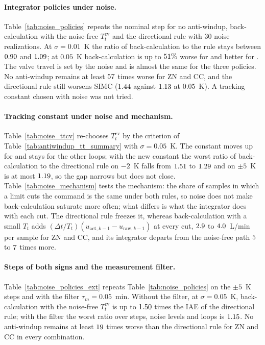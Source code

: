 \documentclass[11pt]{article}
\begin{document}


\paragraph{Integrator policies under noise.} Table~\ref{tab:noise_policies} repeats the nominal step for no anti-windup, back-calculation with the noise-free $T_t^{\mathrm{cv}}$ and the directional rule with $30$ noise realizations. At $\sigma = 0.01$~K the ratio of back-calculation to the rule stays between $0.90$ and $1.09$; at $0.05$~K back-calculation is up to $51\%$ worse for \vnzbcworse{} and better for \vnzbcbetter{}. The valve travel is set by the noise and is almost the same for the three policies. No anti-windup remains at least $57$ times worse for ZN and CC, and the directional rule still worsens SIMC ($1.44$ against $1.13$ at $0.05$~K). A tracking constant chosen with noise was not tried.



\paragraph{Tracking constant under noise and mechanism.} Table~\ref{tab:noise_ttcv} re-chooses $T_t^{\mathrm{cv}}$ by the criterion of Table~\ref{tab:antiwindup_tt_summary} with $\sigma = 0.05$~K. The constant moves up for \vnzttchanged{} and stays for the other loops; with the new constant the worst ratio of back-calculation to the directional rule on $-2$~K falls from $1.51$ to $1.29$ and on $\pm 5$~K is at most $1.19$, so the gap narrows but does not close. Table~\ref{tab:noise_mechanism} tests the mechanism: the share of samples in which a limit cuts the command is the same under both rules, so noise does not make back-calculation saturate more often; what differs is what the integrator does with each cut. The directional rule freezes it, whereas back-calculation with a small $T_t$ adds $(\Delta t/T_t)(u_{\text{act},k-1} - u_{\text{raw},k-1})$ at every cut, $2.9$ to $4.0$~L/min per sample for ZN and CC, and its integrator departs from the noise-free path $5$ to $7$ times more.





\paragraph{Steps of both signs and the measurement filter.} Table~\ref{tab:noise_policies_ext} repeats Table~\ref{tab:noise_policies} on the $\pm 5$~K steps and with the filter $\tau_m = 0.05$~min. Without the filter, at $\sigma = 0.05$~K, back-calculation with the noise-free $T_t^{\mathrm{cv}}$ is up to $1.50$ times the IAE of the directional rule; with the filter the worst ratio over steps, noise levels and loops is $1.15$. No anti-windup remains at least $19$ times worse than the directional rule for ZN and CC in every combination.
\end{document}

